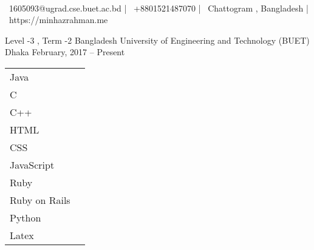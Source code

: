 \documentclass[]{awesome-cv}
\begin{document}
    
\begin{center}
	  \\
	\vspace{2mm}
	{\faEnvelope\ 1605093@ugrad.cse.buet.ac.bd} | {\faMobile\ +8801521487070} | {\faMapMarker\ Chattogram , Bangladesh} | {\faLink\ https://minhazrahman.me}
\end{center}
\begin{cventries}
	\cventry
	{Level -3 , Term -2}
	{Bangladesh University of Engineering and Technology (BUET)}
	{Dhaka}
	{February, 2017 – Present}
	{}
\end{cventries}

\vspace{-2mm}

\begin{cventries}
	\cventry
	{}
	{\def\arraystretch{1.15}{\begin{tabular}{ l l }
		Java  & {\skill{ }} \\
		C  & {\skill{ }} \\
		C++  & {\skill{ }} \\
		HTML  & {\skill{ }} \\
		CSS  & {\skill{ }} \\
		JavaScript  & {\skill{ }} \\
		Ruby  & {\skill{ }} \\
		Ruby on Rails  & {\skill{ }} \\
		Python  & {\skill{ }} \\
		Latex  & {\skill{ }} \\
		\end{tabular}}}
	{}
	{}
	{}
\end{cventries}
\end{document}
